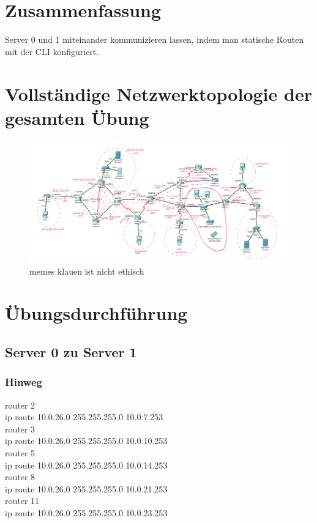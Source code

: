 \documentclass[a4paper]{article}
\begin{document}
\section{Zusammenfassung}
Server 0 und 1 miteinander kommunizieren lassen, indem man statische Routen mit der CLI konfiguriert.


\newpage

\section{Vollständige Netzwerktopologie der gesamten Übung}

\begin{figure}[h]
	\includegraphics[scale=0.6]{topologie.png}
	\caption{memes klauen ist nicht ethisch}
\end{figure}

\newpage

\section{Übungsdurchführung}
\subsection{Server 0 zu Server 1}

\subsubsection{Hinweg}
router 2\\
ip route 10.0.26.0 255.255.255.0 10.0.7.253 \\
router 3\\
ip route 10.0.26.0 255.255.255.0 10.0.10.253\\
router 5\\
ip route 10.0.26.0 255.255.255.0 10.0.14.253\\
router 8\\
ip route 10.0.26.0 255.255.255.0 10.0.21.253\\
router 11\\
ip route 10.0.26.0 255.255.255.0 10.0.23.253\\
\end{document}
